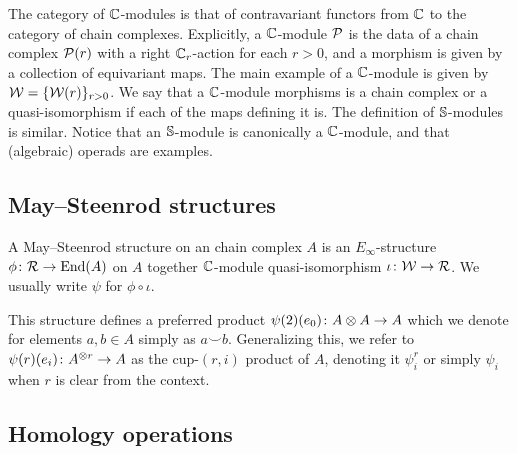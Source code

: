 The category of $\mathbb{C}$-modules is that of contravariant functors from $\mathbb{C}$ to the category of chain complexes.
Explicitly, a $\mathbb{C}$-module $\mathcal{P}$ is the data of a chain complex $\mathcal{P}(r)$ with a right $\mathbb{C}_r$-action for each $r > 0$, and a morphism is given by a collection of equivariant maps.
The main example of a $\mathbb{C}$-module is given by $\mathcal{W} = \{\mathcal{W}(r)\}_{r>0}$.
We say that a $\mathbb{C}$-module morphisms is a chain complex or a quasi-isomorphism if each of the maps defining it is.
The definition of $\mathbb{S}$-modules is similar.
Notice that an $\mathbb{S}$-module is canonically a $\mathbb{C}$-module, and that (algebraic) operads are examples.

\subsection{May--Steenrod structures}

A May--Steenrod structure on an chain complex $A$ is an $E_\infty$-structure $\phi \colon \mathcal{R} \to \mathrm{End}(A)$ on $A$ together $\mathbb{C}$-module quasi-isomorphism $\iota \colon \mathcal{W} \to \mathcal{R}$.
We usually write $\psi$ for $\phi \circ \iota$.

This structure defines a preferred product $\psi(2)(e_0) \colon A \otimes A \to A$ which we denote for elements $a,b \in A$ simply as $a \smallsmile b$.
Generalizing this, we refer to $\psi(r)(e_i) \colon A^{\otimes r} \to A$ as the cup-$(r,i)$ product of $A$, denoting it $\psi_i^r$ or simply $\psi_i$ when $r$ is clear from the context.

\subsection{Homology operations}

